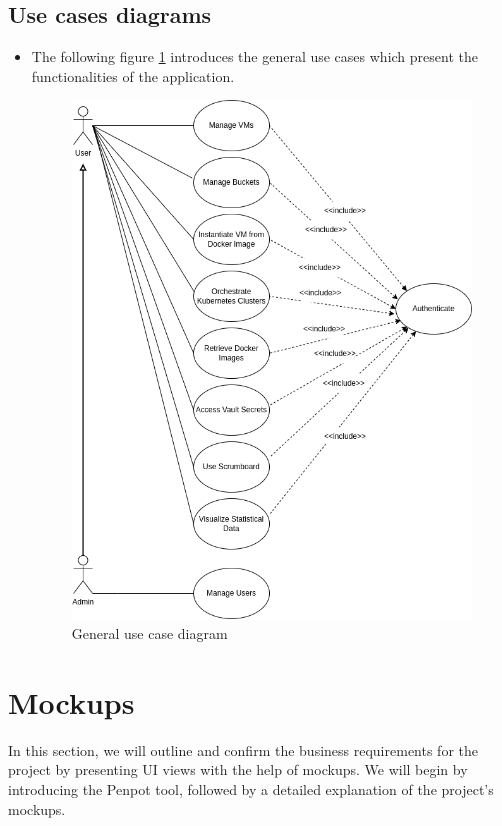 \subsection{Use cases diagrams}
\begin{itemize}

    \item The following figure  \hyperref[fig:general_use_cases]{\ref{fig:general_use_cases}} introduces the general use cases which present the
functionalities of the application.

\begin{figure}[htbp]
  \center
  \includegraphics[width=19cm]{general_use_cases}
  \caption{General use case diagram}
  \label{fig:general_use_cases}
\end{figure}




\end{itemize}


\section{Mockups}
In this section, we will outline and confirm the business requirements for the project by presenting UI views 
with the help of mockups. We will begin by introducing the Penpot tool,
followed by a detailed explanation of the project's mockups.



